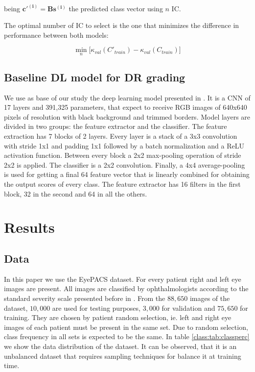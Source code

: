 \documentclass[review]{elsarticle}
\theoremstyle{definition} %
\theoremstyle{remark}
\begin{document}
being $\boldsymbol{c'^{(i)}} = \boldsymbol{B} \boldsymbol{s^{(i)}}$ the predicted class vector using $n$ IC.

The optimal number of IC to select is the one that minimizes the difference in performance between both models:

\begin{equation}
\min_{n} \big[ \kappa_{val} (C'_{train}) - \kappa_{val} (C_{train}) \big] 
\end{equation}

\subsection{Baseline DL model for DR grading}

We use as base of our study the deep learning model presented in \cite{de2017deep}. It is a CNN of 17 layers and 391,325 parameters, that expect to receive RGB images of 640x640 pixels of resolution with black background and trimmed borders. Model layers are divided in two groups: the feature extractor and the classifier. The feature extraction has 7 blocks of 2 layers. Every layer is a stack of a 3x3 convolution with stride 1x1 and padding 1x1 followed by a batch normalization and a ReLU activation function. Between every block a 2x2 max-pooling operation of stride 2x2 is applied.  The classifier is a 2x2 convolution. Finally, a 4x4 average-pooling is used for getting a final 64 feature vector that is linearly combined for obtaining the output scores of every class. The feature extractor has 16 filters in the first block, 32 in the second and 64 in all the others. 


\section{Results}\label{sec:results}

\subsection{Data}

In this paper we use the EyePACS dataset. For every patient right and left eye images are present. All images are classified by ophthalmologists according to the standard severity scale presented before in \cite{diaclass}. From the $88,650$ images of the dataset, $10,000$ are used for testing purposes, $3,000$ for validation and $75,650$ for training. They are chosen by patient random selection, ie. left and right eye images of each patient must be present in the same set. Due to random selection, class frequency in all sets is expected to be the same. In table \ref{class:tab:classperc} we show the data distribution of the dataset. It can be observed, that it is an unbalanced dataset that requires sampling techniques for balance it at training time.
\end{document}

